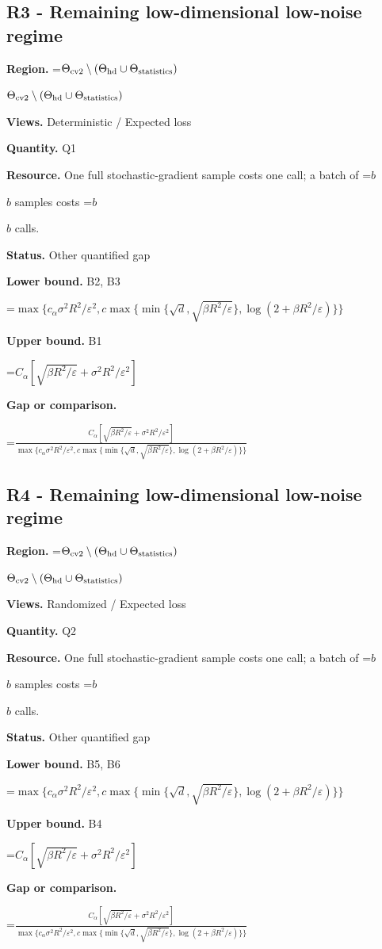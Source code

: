 \documentclass[10pt,a4paper]{article}
\newcommand{\AtlasMath}[1]{\par\begingroup\centering\setbox0=\hbox{$\displaystyle #1$}\ifdim\wd0>1.4\linewidth\typeout{ATLAS WIDE FORMULA: \the\wd0}\fi\ifdim\wd0>\linewidth\resizebox{\linewidth}{!}{\box0}\else\box0\fi\par\endgroup}
\newcommand{\AtlasInlineMath}[1]{\begingroup\setbox0=\hbox{$#1$}\ifdim\wd0>.4\linewidth\endgroup\AtlasMath{#1}\else\endgroup$#1$\fi}
\begin{document}
\subsection{R3 - Remaining low-dimensional low-noise regime}
\textbf{Region.} \AtlasInlineMath{\Theta_{\rm cv2}\setminus(\Theta_{\rm hd}\cup\Theta_{\rm statistics})}

\textbf{Views.} Deterministic / Expected loss

\textbf{Quantity.} Q1

\textbf{Resource.} One full stochastic-gradient sample costs one call; a batch of \AtlasInlineMath{b} samples costs \AtlasInlineMath{b} calls.

\textbf{Status.} Other quantified gap

\textbf{Lower bound.} B2, B3

\AtlasMath{\max\{c_\alpha \sigma^2R^2/\varepsilon^2,c\max\{\min\{\sqrt d,\sqrt{\beta R^2/\varepsilon}\},\log(2+\beta R^2/\varepsilon)\}\}}
\textbf{Upper bound.} B1

\AtlasMath{C_\alpha[\sqrt{\beta R^2/\varepsilon}+\sigma^2R^2/\varepsilon^2]}
\textbf{Gap or comparison.} 
\AtlasMath{\frac{C_\alpha[\sqrt{\beta R^2/\varepsilon}+\sigma^2R^2/\varepsilon^2]}{\max\{c_\alpha \sigma^2R^2/\varepsilon^2,c\max\{\min\{\sqrt d,\sqrt{\beta R^2/\varepsilon}\},\log(2+\beta R^2/\varepsilon)\}\}}}


\subsection{R4 - Remaining low-dimensional low-noise regime}
\textbf{Region.} \AtlasInlineMath{\Theta_{\rm cv2}\setminus(\Theta_{\rm hd}\cup\Theta_{\rm statistics})}

\textbf{Views.} Randomized / Expected loss

\textbf{Quantity.} Q2

\textbf{Resource.} One full stochastic-gradient sample costs one call; a batch of \AtlasInlineMath{b} samples costs \AtlasInlineMath{b} calls.

\textbf{Status.} Other quantified gap

\textbf{Lower bound.} B5, B6

\AtlasMath{\max\{c_\alpha \sigma^2R^2/\varepsilon^2,c\max\{\min\{\sqrt d,\sqrt{\beta R^2/\varepsilon}\},\log(2+\beta R^2/\varepsilon)\}\}}
\textbf{Upper bound.} B4

\AtlasMath{C_\alpha[\sqrt{\beta R^2/\varepsilon}+\sigma^2R^2/\varepsilon^2]}
\textbf{Gap or comparison.} 
\AtlasMath{\frac{C_\alpha[\sqrt{\beta R^2/\varepsilon}+\sigma^2R^2/\varepsilon^2]}{\max\{c_\alpha \sigma^2R^2/\varepsilon^2,c\max\{\min\{\sqrt d,\sqrt{\beta R^2/\varepsilon}\},\log(2+\beta R^2/\varepsilon)\}\}}}
\end{document}
